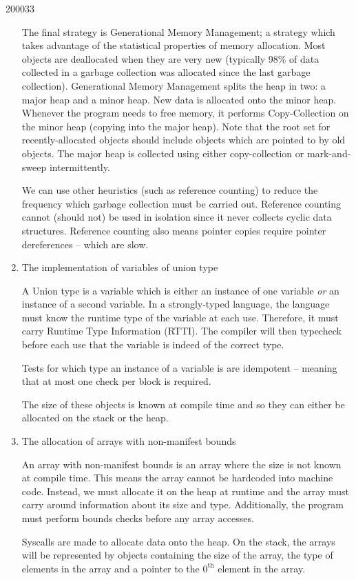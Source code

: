 \documentclass[10pt,\jkfside,a4paper]{article}
\begin{document}
\begin{examquestion}{2000}{3}{3}
\begin{enumerate}
The final strategy is Generational Memory Management; a strategy which
takes advantage of the statistical properties of memory allocation. Most
objects are deallocated when they are very new (typically 98\% of data
collected in a garbage collection was allocated since the last garbage
collection). Generational Memory Management splits the heap in two: a major
heap and a minor heap. New data is allocated onto the minor heap. Whenever
the program needs to free memory, it performs Copy-Collection on the minor
heap (copying into the major heap). Note that the root set for
recently-allocated objects should include objects which are pointed to by
old objects. The major heap is collected using either copy-collection or
mark-and-sweep intermittently.

We can use other heuristics (such as reference counting) to reduce the
frequency which garbage collection must be carried out. Reference counting
cannot (should not) be used in isolation since it never collects cyclic data
structures. Reference counting also means pointer copies require pointer
dereferences -- which are slow.

\item The implementation of variables of union type

A Union type is a variable which is either an instance of one variable
\textit{or} an instance of a second variable. In a strongly-typed language,
the language must know the runtime type of the variable at each use.
Therefore, it must carry Runtime Type Information (RTTI). The compiler will
then typecheck before each use that the variable is indeed of the correct
type.

Tests for which type an instance of a variable is are idempotent -- meaning
that at most one check per block is required.

The size of these objects is known at compile time and so they can either be
allocated on the stack or the heap.

\item The allocation of arrays with non-manifest bounds

An array with non-manifest bounds is an array where the size is not known at
compile time. This means the array cannot be hardcoded into machine code.
Instead, we must allocate it on the heap at runtime and the array must carry
around information about its size and type. Additionally, the program must
perform bounds checks before any array accesses.

Syscalls are made to allocate data onto the heap. On the stack, the arrays
will be represented by objects containing the size of the array, the type of
elements in the array and a pointer to the $0^{\text{th}}$ element in the
array.


\end{enumerate}
\end{examquestion}
\end{document}

